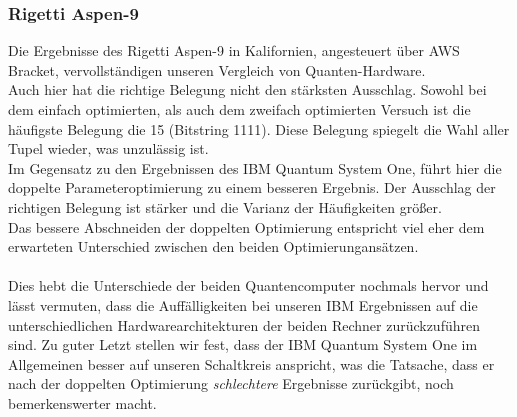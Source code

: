 \subsubsection{Rigetti Aspen-9}
Die Ergebnisse des Rigetti Aspen-9 in Kalifornien, angesteuert über AWS Bracket, vervollständigen unseren Vergleich von Quanten-Hardware.\\
Auch hier hat die richtige Belegung nicht den stärksten Ausschlag. Sowohl bei dem einfach optimierten, als auch dem zweifach optimierten Versuch ist die häufigste Belegung die 15 (Bitstring 1111).
Diese Belegung spiegelt die Wahl aller Tupel wieder, was unzulässig ist.\\
Im Gegensatz zu den Ergebnissen des IBM Quantum System One, führt hier die doppelte Parameteroptimierung zu einem besseren Ergebnis. Der Ausschlag der richtigen Belegung ist stärker und die Varianz der Häufigkeiten größer.\\
Das bessere Abschneiden der doppelten Optimierung entspricht viel eher dem erwarteten Unterschied zwischen den beiden Optimierungansätzen.\\\\

Dies hebt die Unterschiede der beiden Quantencomputer nochmals hervor und lässt vermuten, dass die Auffälligkeiten bei unseren IBM Ergebnissen auf die unterschiedlichen Hardwarearchitekturen der beiden Rechner zurückzuführen sind.
Zu guter Letzt stellen wir fest, dass der IBM Quantum System One im Allgemeinen besser auf unseren Schaltkreis anspricht, was die Tatsache, dass er nach der doppelten Optimierung \textit{schlechtere} Ergebnisse zurückgibt, noch bemerkenswerter macht.
 
